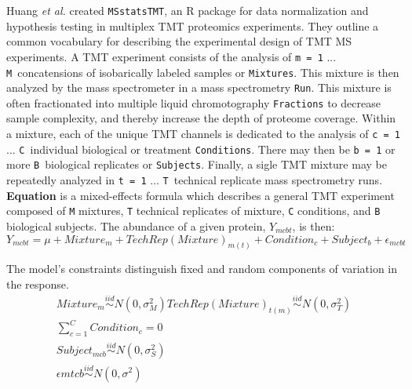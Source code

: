 \documentclass[11pt]{elife}\usepackage[]{graphicx}\usepackage[]{color}
\begin{document}
Huang \textit{et al.} created \texttt{MSstatsTMT}, an R package for data
normalization and hypothesis testing in multiplex TMT proteomics experiments. 
They outline a common vocabulary for describing the experimental design of 
TMT MS experiments. A TMT experiment consists
of the analysis of \texttt{m = 1} ... \texttt{M}\ concatensions of isobarically
labeled samples or \texttt{Mixtures}. This mixture is then analyzed by the mass
spectrometer in a mass spectrometry \texttt{Run}. This mixture is often
fractionated into multiple liquid chromotography \texttt{Fractions} to decrease
sample complexity, and thereby increase the depth of proteome coverage. 
Within a mixture, each of the unique TMT channels is dedicated to the 
analysis of \texttt{c = 1} ... \texttt{C}\ individual biological or treatment 
\texttt{Conditions}.  There may then be \texttt{b = 1} or more \texttt{B}\ 
biological replicates or \texttt{Subjects}. Finally, a sigle TMT mixture may be 
repeatedly analyzed in \texttt{t = 1} ... \texttt{T}\ technical replicate mass 
spectrometry runs.\\

\textbf{Equation} is a mixed-effects formula which describes a general TMT
experiment composed of \texttt{M} mixtures, \texttt{T} technical replicates of 
mixture, \texttt{C} conditions, and \texttt{B} biological subjects.
The abundance of a given protein, $Y_{mcbt}$, is then:\\

\begin{equation}
	Y_{mcbt} = \mu + Mixture_m + TechRep(Mixture)_{m(t)} + Condition_c + 
	Subject_b + \epsilon_{mcbt}
\end{equation}

The model's constraints distinguish fixed and random components of 
variation in the response.\\

\begin{equation}
  \begin{gathered}
	Mixture_m \stackrel{iid}{\sim} N(0,\sigma^2_M)
	TechRep(Mixture)_{t(m)} \stackrel{iid}{\sim} N(0,\sigma^2_T) \\
	\sum_{c=1}^{C} Condition_c = 0 \\
	Subject_{mcb} \stackrel{iid}{\sim} N(0,\sigma^2_S) \\
	\epsilon{mtcb} \stackrel{iid}{\sim} N(0,\sigma^2) \\
  \end{gathered}
\end{equation}
\end{document}
